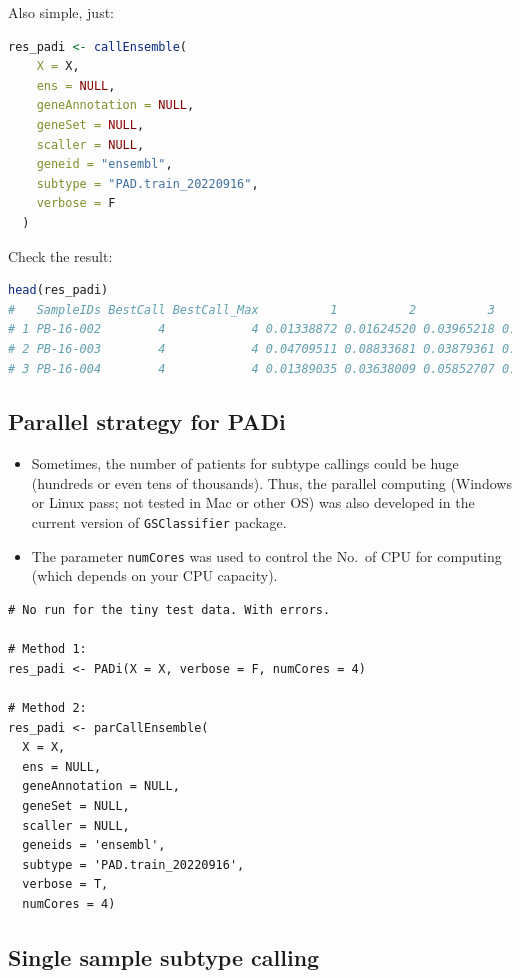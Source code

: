 \documentclass[
  12pt,
]{book}
\newcommand{\passthrough}[1]{#1}
\begin{document}
Also simple, just:

\begin{lstlisting}[language=R]
res_padi <- callEnsemble(
    X = X,
    ens = NULL,
    geneAnnotation = NULL,
    geneSet = NULL,
    scaller = NULL,
    geneid = "ensembl",
    subtype = "PAD.train_20220916",
    verbose = F
  )
\end{lstlisting}

Check the result:

\begin{lstlisting}[language=R]
head(res_padi)
#   SampleIDs BestCall BestCall_Max          1          2          3         4
# 1 PB-16-002        4            4 0.01338872 0.01624520 0.03965218 0.8052567
# 2 PB-16-003        4            4 0.04709511 0.08833681 0.03879361 0.6244038
# 3 PB-16-004        4            4 0.01389035 0.03638009 0.05852707 0.6980438
\end{lstlisting}

\hypertarget{parallel-strategy-for-padi}{%
\subsection{Parallel strategy for PADi}\label{parallel-strategy-for-padi}}

\begin{itemize}
\item
  Sometimes, the number of patients for subtype callings could be huge (hundreds or even tens of thousands). Thus, the parallel computing (Windows or Linux pass; not tested in Mac or other OS) was also developed in the current version of \passthrough{\lstinline!GSClassifier!} package.
\item
  The parameter \passthrough{\lstinline!numCores!} was used to control the No.~of CPU for computing (which depends on your CPU capacity).
\end{itemize}

\begin{lstlisting}
# No run for the tiny test data. With errors.

# Method 1:
res_padi <- PADi(X = X, verbose = F, numCores = 4)

# Method 2: 
res_padi <- parCallEnsemble(
  X = X,
  ens = NULL,
  geneAnnotation = NULL,
  geneSet = NULL,
  scaller = NULL,
  geneids = 'ensembl',
  subtype = 'PAD.train_20220916',
  verbose = T,
  numCores = 4)
\end{lstlisting}

\hypertarget{single-sample-subtype-calling}{%
\subsection{Single sample subtype calling}\label{single-sample-subtype-calling}}
\end{document}
